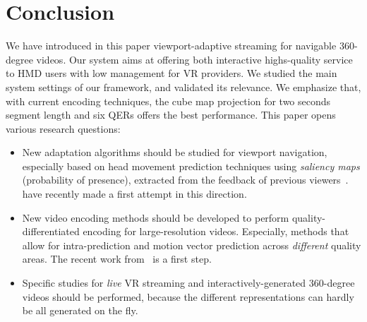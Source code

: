 \section{Conclusion}
\label{sec:conclusion}

We have introduced in this paper viewport-adaptive streaming for
navigable $360$-degree videos. Our system aims at offering both
interactive highs-quality service to \ac{HMD} users with low management
for \ac{VR} providers.
We studied the main system
settings of our framework, and validated its relevance.
We emphasize that, with current encoding techniques, the cube
map projection for two seconds segment length and six
\acp{QER} offers the best performance. This
paper opens various research questions:
\begin{itemize}
  \item New adaptation algorithms should be studied for viewport navigation,
especially based on head movement prediction techniques using \emph{saliency maps} (probability of
presence), extracted from the feedback of
previous viewers~\cite{han2014spatial}. \citet{allthings} have recently made a first attempt in this
direction.

  \item New video encoding methods should be
developed to perform quality-differentiated encoding for
large-resolution videos. Especially, methods that allow for
intra-prediction and motion vector prediction across \emph{different} quality
areas. The recent work from~\citet{vishyArxiv} is a first step.

\item Specific studies for \emph{live} \ac{VR} streaming
and interactively-generated $360$-degree videos should be performed,
because the different representations can hardly be all
generated on the fly.
\end{itemize}
